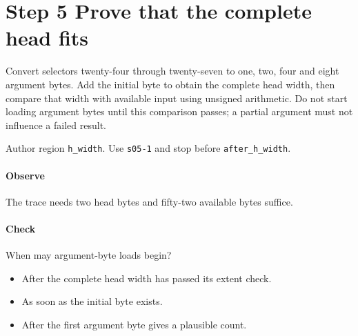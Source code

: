 \section{Step 5 Prove that the complete head fits}\label{cbor-s05}
Convert selectors twenty-four through twenty-seven to one, two, four and eight argument bytes. Add the initial byte to obtain the complete head width, then compare that width with available input using unsigned arithmetic. Do not start loading argument bytes until this comparison passes; a partial argument must not influence a failed result.

Author region \texttt{h\_width}. Use \texttt{s05-1} and stop before \texttt{after\_h\_width}.

\paragraph{Observe} The trace needs two head bytes and fifty-two available bytes suffice.

\paragraph{Check} When may argument-byte loads begin?
\begin{itemize}
\item[A.] After the complete head width has passed its extent check.
\item[B.] As soon as the initial byte exists.
\item[C.] After the first argument byte gives a plausible count.
\end{itemize}
